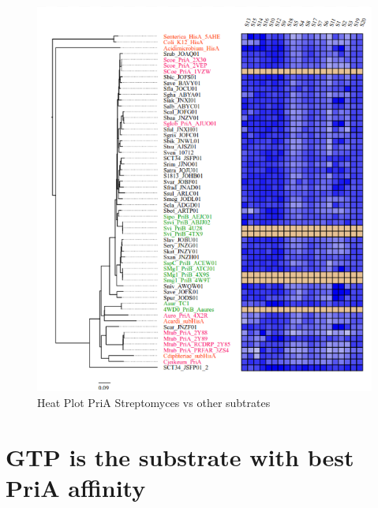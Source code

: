 \documentclass[12pt,twoside]{reedthesis}
\begin{document}
  \begin{figure}[h!tbp]
  \centering
  \includegraphics[angle = 0,scale = 0.6]{chapter4/PriAHeatPot.png}
  \caption[Heat Plot PriA Streptomyces vs other subtrates]{\normalsize{Heat Plot PriA Streptomyces vs other subtrates}}
  \label{fig:PriADocking}
  \end{figure}
  
  \section{GTP is the substrate with best PriA
  affinity}\label{gtp-is-the-substrate-with-best-pria-affinity}
  
\end{document}
